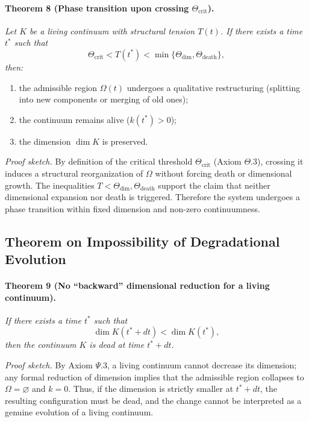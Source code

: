\paragraph{Theorem 8 (Phase transition upon crossing \(\Theta_{\mathrm{crit}}\)).}
\emph{Let \(K\) be a living continuum with structural tension \(T(t)\).
If there exists a time \(t^*\) such that}
\[
  \Theta_{\mathrm{crit}} < T(t^*) < \min\{\Theta_{\mathrm{dim}},\Theta_{\mathrm{death}}\},
\]
\emph{then:}
\begin{enumerate}
  \item the admissible region \(\Omega(t)\) undergoes a qualitative restructuring (splitting into new components or merging of old ones);
  \item the continuum remains alive (\(k(t^*)>0\));
  \item the dimension \(\dim K\) is preserved.
\end{enumerate}

\emph{Proof sketch.}
By definition of the critical threshold \(\Theta_{\mathrm{crit}}\) (Axiom \(\Theta.3\)), crossing it induces a structural reorganization of \(\Omega\) without forcing death or dimensional growth.
The inequalities \(T<\Theta_{\mathrm{dim}},\Theta_{\mathrm{death}}\) support the claim that neither dimensional expansion nor death is triggered.
Therefore the system undergoes a phase transition within fixed dimension and non-zero continuumness.

\subsection{Theorem on Impossibility of Degradational Evolution}

\paragraph{Theorem 9 (No ``backward'' dimensional reduction for a living continuum).}
\emph{If there exists a time \(t^*\) such that}
\[
  \dim K(t^*+dt) < \dim K(t^*),
\]
\emph{then the continuum \(K\) is dead at time \(t^*+dt\).}

\emph{Proof sketch.}
By Axiom \(\Psi.3\), a living continuum cannot decrease its dimension; any formal reduction of dimension implies that the admissible region collapses to \(\Omega=\varnothing\) and \(k=0\).
Thus, if the dimension is strictly smaller at \(t^*+dt\), the resulting configuration must be dead, and the change cannot be interpreted as a genuine evolution of a living continuum.
